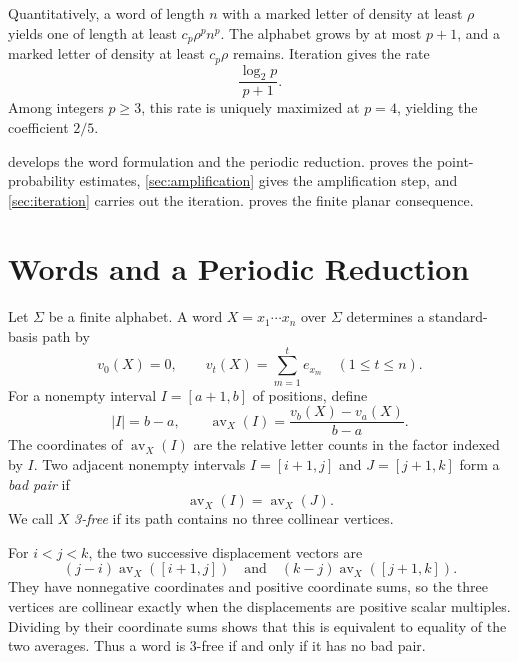 \documentclass[11pt]{article}
\theoremstyle{plain}
\theoremstyle{definition}
\theoremstyle{remark}
\newcommand{\avg}{\operatorname{av}}
\begin{document}
Quantitatively, a word of length \(n\) with a marked letter of density at least \(\rho\) yields one of length at least \(c_p\rho^pn^p\). The alphabet grows by at most \(p+1\), and a marked letter of density at least \(c_p\rho\) remains. Iteration gives the rate
\[
        \frac{\log_2p}{p+1}.
\]
Among integers \(p\ge3\), this rate is uniquely maximized at \(p=4\), yielding the coefficient \(2/5\).

 develops the word formulation and the periodic reduction.  proves the point-probability estimates, \cref{sec:amplification} gives the amplification step, and \cref{sec:iteration} carries out the iteration.  proves the finite planar consequence.

\section{Words and a Periodic Reduction}\label{sec:words}

Let \(\Sigma\) be a finite alphabet. A word \(X=x_1\cdots x_n\) over \(\Sigma\) determines a standard-basis path by
\begin{equation}\label{eq:path-from-steps}
        v_0(X)=0,
        \qquad
        v_t(X)=\sum_{m=1}^t e_{x_m}
        \quad (1\le t\le n).
\end{equation}
For a nonempty interval \(I=[a+1,b]\) of positions, define
\begin{equation}\label{eq:average-increment}
        |I|=b-a,
        \qquad
        \avg_X(I)=\frac{v_b(X)-v_a(X)}{b-a}.
\end{equation}
The coordinates of \(\avg_X(I)\) are the relative letter counts in the factor indexed by \(I\). Two adjacent nonempty intervals \(I=[i+1,j]\) and \(J=[j+1,k]\) form a \emph{bad pair} if
\begin{equation}\label{eq:bad-pair}
        \avg_X(I)=\avg_X(J).
\end{equation}
We call \(X\) \emph{3-free} if its path contains no three collinear vertices.

For \(i<j<k\), the two successive displacement vectors are
\[
        (j-i)\avg_X([i+1,j])
        \quad\text{and}\quad
        (k-j)\avg_X([j+1,k]).
\]
They have nonnegative coordinates and positive coordinate sums, so the three vertices are collinear exactly when the displacements are positive scalar multiples. Dividing by their coordinate sums shows that this is equivalent to equality of the two averages. Thus a word is 3-free if and only if it has no bad pair.
\end{document}
